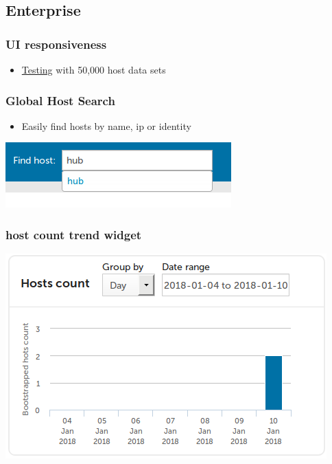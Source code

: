 \documentclass[11pt]{article}
\begin{document}
\subsection*{Enterprise}
\label{sec:org42af890}
\subsubsection*{UI responsiveness}
\label{sec:org43d7294}
\begin{itemize}
\item \href{data/75/971753-cddb-4739-a0a1-dcb66df44ab9/alert-status-speed-comparison.webm}{Testing} with 50,000 host data sets
\end{itemize}

\subsubsection*{Global Host Search}
\label{sec:org82709f3}
\begin{itemize}
\item Easily find hosts by name, ip or identity
\end{itemize}

\begin{center}
\includegraphics[width=.9\linewidth]{data/f9/7c9b4d-d46f-4aee-bd68-630f44106b0e/2018-01-14_Selection_002_2018-01-14_13-21-21.png}
\end{center}

\subsubsection*{host count trend widget}
\label{sec:orgca2142f}
\begin{center}
\includegraphics[width=.9\linewidth]{data/e9/0e4df9-0bb7-4a1e-84d5-25911497f93c/2018-01-10_Selection_001_2018-01-14_12-02-44.png}
\end{center}
\end{document}
